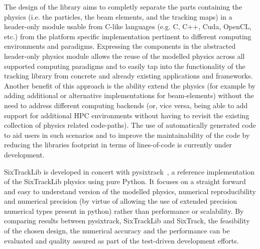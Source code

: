 \documentclass{ws-ijmpa}
\begin{document}
The design of the library aims to completly separate the parts containing the physics (i.e. the particles, the beam elements, and the tracking maps) in a header-only module usable from C-like languages (e.g. C, C++, Cuda, OpenCL, etc.) 
from the platform specific implementation pertinent to different computing environments and paradigms. Expressing the components in the abstracted header-only physics module allows the reuse of the modelled physics across all 
supported computing paradigms and to easily tap into the functionality of the tracking library from concrete and already existing applications and frameworks. Another benefit of this approach is the ability extend the physics (for example 
by adding additional or alternative implementations for beam-elements) without the need to address different computing backends (or, vice versa, being able to add support for additional HPC environments without having to revisit the 
existing collection of physics related code-paths). The use of automatically generated code to aid users in such scenarios and to improve the maintainability of the code by reducing the libraries footprint in terms of lines-of-code is currently under development.  

SixTrackLib is developed in concert with pysixtrack~\cite{pysixtrack}, a reference implementation of the SixTrackLib physics using pure Python. It focuses on a straight forward and easy to understand version of the modelled physics, numerical reproducibility and numerical precision (by virtue of allowing the use of extended precision numerical types present in python) rather than performance or scalability. By comparing results between pysixtrack, SixTrackLib and SixTrack, the feasibility of the chosen design, the numerical accuracy and the performance can be evaluated and quality assured as part of the test-driven development efforts.
 
\end{document}
